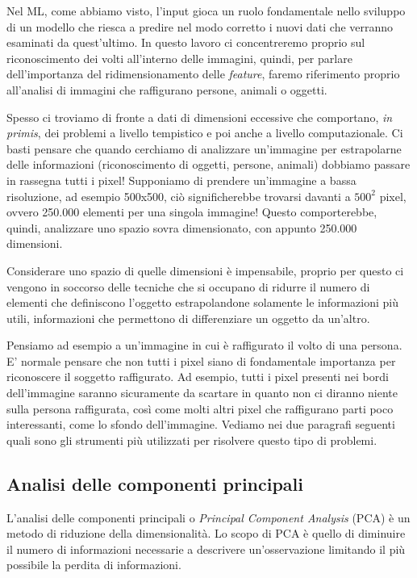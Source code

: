 \documentclass[12pt,italian]{report}
\begin{document}
Nel ML, come abbiamo visto, l'input gioca un ruolo fondamentale nello sviluppo di un modello che riesca a predire nel modo corretto i nuovi dati che verranno esaminati da quest'ultimo.
In questo lavoro ci concentreremo proprio sul riconoscimento dei volti all'interno delle immagini, quindi, per parlare dell'importanza del ridimensionamento delle \emph{feature}, faremo riferimento proprio all'analisi di immagini che raffigurano persone, animali o oggetti.

Spesso ci troviamo di fronte a dati di dimensioni eccessive che comportano, \emph{in primis}, dei problemi a livello tempistico e poi anche a livello computazionale. Ci basti pensare che quando cerchiamo di analizzare un'immagine per estrapolarne delle informazioni (riconoscimento di oggetti, persone, animali) dobbiamo passare in rassegna tutti i pixel! Supponiamo di prendere un'immagine a bassa risoluzione, ad esempio 500x500, ciò significherebbe trovarsi davanti a $ 500^2 $ pixel, ovvero 250.000 elementi per una singola immagine! Questo comporterebbe, quindi, analizzare uno spazio sovra dimensionato, con appunto 250.000 dimensioni.

Considerare uno spazio di quelle dimensioni è impensabile, proprio per questo ci vengono in soccorso delle tecniche che si occupano di ridurre il numero di elementi che definiscono l'oggetto estrapolandone solamente le informazioni più utili, informazioni che permettono di differenziare un oggetto da un'altro.

Pensiamo ad esempio a un'immagine in cui è raffigurato il volto di una persona. E' normale pensare che non tutti i pixel siano di fondamentale importanza per riconoscere il soggetto raffigurato. Ad esempio, tutti i pixel presenti nei bordi dell'immagine saranno sicuramente da scartare in quanto non ci diranno niente sulla persona raffigurata, così come molti altri pixel che raffigurano parti poco interessanti, come lo sfondo dell'immagine. Vediamo nei due paragrafi seguenti quali sono gli strumenti più utilizzati per risolvere questo tipo di problemi.


\subsection{Analisi delle componenti principali}
L'analisi delle componenti principali o \emph{Principal Component Analysis} (PCA) è un metodo di riduzione della dimensionalità. Lo scopo di PCA è quello di diminuire il numero di informazioni necessarie a descrivere un'osservazione limitando il più possibile la perdita di informazioni. 
\end{document}
